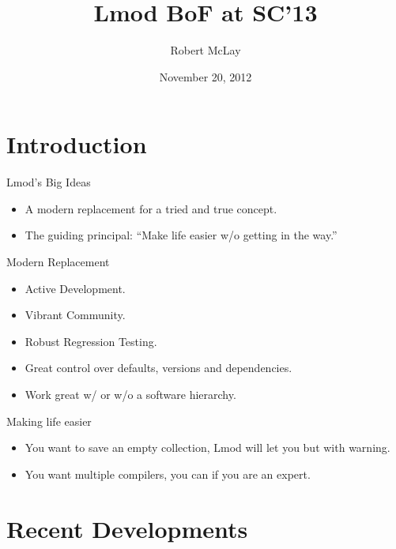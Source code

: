 \documentclass{beamer}
\title{Lmod BoF at SC'13}
\author{Robert McLay}
\institute{The Texas Advanced Computing Center}
\date{November 20, 2012}  %
\begin{document}
\begin{frame}
  \titlepage
\end{frame}

\section{Introduction}

\begin{frame}{Lmod's Big Ideas}
  \begin{itemize}
    \item A modern replacement for a tried and true concept.
    \item The guiding principal: ``Make life easier w/o getting in
      the way.''
  \end{itemize}
\end{frame}


\begin{frame}{Modern Replacement}
  \begin{itemize}
    \item Active Development.
    \item Vibrant Community.
    \item Robust Regression Testing.
    \item Great control over defaults, versions and dependencies.
    \item Work great w/ or w/o a software hierarchy.
  \end{itemize}
\end{frame}

\begin{frame}{Making life easier}
  \begin{itemize}
    \item You want to save an empty collection, Lmod will let you but
      with warning.
    \item You want multiple compilers, you can if you are an expert.
  \end{itemize}
\end{frame}

\section{Recent Developments}
\end{document}
